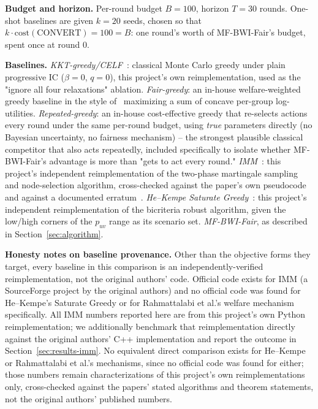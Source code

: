 \documentclass[journal]{IEEEtran}
\begin{document}
\textbf{Budget and horizon.} Per-round budget $B=100$, horizon $T=30$
rounds. One-shot baselines are given $k=20$ seeds, chosen so that
$k\cdot\mathrm{cost}(\mathrm{CONVERT})=100=B$: one round's worth of
MF-BWI-Fair's budget, spent once at round 0.

\textbf{Baselines.} \emph{KKT-greedy/CELF}~\cite{kempe2003maximizing,leskovec2007cost}:
classical Monte Carlo greedy under plain progressive IC ($\beta=0$, $q=0$),
this project's own reimplementation, used as the "ignore all four
relaxations" ablation. \emph{Fair-greedy}: an in-house welfare-weighted
greedy baseline in the style of~\cite{rahmattalabi2021fair} maximizing a
sum of concave per-group log-utilities. \emph{Repeated-greedy}: an in-house
cost-effective greedy that re-selects actions every round under the same
per-round budget, using \emph{true} parameters directly (no Bayesian
uncertainty, no fairness mechanism) -- the strongest plausible classical
competitor that also acts repeatedly, included specifically to isolate
whether MF-BWI-Fair's advantage is more than "gets to act every round."
\emph{IMM}~\cite{tang2015influence}: this project's independent
reimplementation of the two-phase martingale sampling and node-selection
algorithm, cross-checked against the paper's own pseudocode and against a
documented erratum~\cite{chen2018issue}. \emph{He--Kempe Saturate
Greedy}~\cite{he2016robust}: this project's independent reimplementation of
the bicriteria robust algorithm, given the low/high corners of the
$p_{uv}$ range as its scenario set. \emph{MF-BWI-Fair}, as described in
Section~\ref{sec:algorithm}.

\textbf{Honesty notes on baseline provenance.} Other than the objective
forms they target, every baseline in this comparison is an
independently-verified reimplementation, not the original authors' code.
Official code exists for IMM (a SourceForge project by the original
authors) and no official code was found for He--Kempe's Saturate Greedy or
for Rahmattalabi et al.'s welfare mechanism specifically. All IMM numbers
reported here are from this project's own Python reimplementation; we
additionally benchmark that reimplementation directly against the original
authors' C++ implementation and report the outcome in
Section~\ref{sec:results-imm}. No equivalent direct comparison
exists for He--Kempe or Rahmattalabi et al.'s mechanisms, since no official
code was found for either; those numbers remain characterizations of this
project's own reimplementations only, cross-checked against the papers'
stated algorithms and theorem statements, not the original authors'
published numbers.
\end{document}
